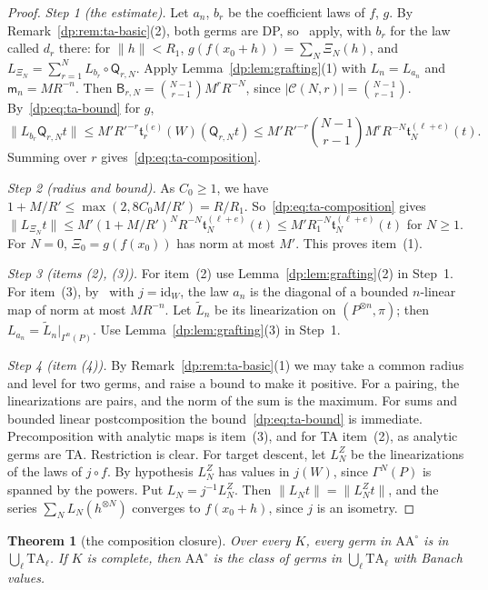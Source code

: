 \documentclass[11pt]{amsart}
\newtheorem{theorem}{Theorem}[section]
\theoremstyle{definition}
\theoremstyle{remark}
\numberwithin{equation}{section}
\newcommand{\id}{\mathrm{id}}
\newcommand{\abs}[1]{\lvert #1\rvert}
\newcommand{\norm}[1]{\lVert #1\rVert}
\theoremstyle{plain}
\theoremstyle{definition}
\theoremstyle{plain}
\begin{document}
\begin{proof}
\emph{Step 1 (the estimate).} Let $a_n$, $b_r$ be the coefficient laws of $f$, $g$. By Remark~\ref{dp:rem:ta-basic}(2), both germs are DP, so~\cite[Lemmas~Q.3, Q.4]{I} apply, with $b_r$ for the law called $d_r$ there: for $\norm h<R_1$, $g(f(x_0+h))=\sum_N\Xi_N(h)$, and $L_{\Xi_N}=\sum_{r=1}^NL_{b_r}\circ\mathsf Q_{r,N}$. Apply Lemma~\ref{dp:lem:grafting}(1) with $L_n=L_{a_n}$ and $\mathsf m_n=MR^{-n}$. Then $\mathsf B_{r,N}=\binom{N-1}{r-1}M^rR^{-N}$, since $\abs{\mathcal C(N,r)}=\binom{N-1}{r-1}$. By~\eqref{dp:eq:ta-bound} for $g$,
\[
 \norm{L_{b_r}\mathsf Q_{r,N}t}\le M'R'^{-r}\mathfrak t^{(e)}_r(W)(\mathsf Q_{r,N}t)\le M'R'^{-r}\binom{N-1}{r-1}M^rR^{-N}\mathfrak t^{(\ell+e)}_N(t).
\]
Summing over $r$ gives~\eqref{dp:eq:ta-composition}.

\emph{Step 2 (radius and bound).} As $C_0\ge1$, we have $1+M/R'\le\max(2,8C_0M/R')=R/R_1$. So~\eqref{dp:eq:ta-composition} gives $\norm{L_{\Xi_N}t}\le M'(1+M/R')^NR^{-N}\mathfrak t^{(\ell+e)}_N(t)\le M'R_1^{-N}\mathfrak t^{(\ell+e)}_N(t)$ for $N\ge1$. For $N=0$, $\Xi_0=g(f(x_0))$ has norm at most $M'$. This proves item~(1).

\emph{Step 3 (items (2), (3)).} For item~(2) use Lemma~\ref{dp:lem:grafting}(2) in Step~1. For item~(3), by~\cite[Proposition~14.9(1)]{I} with $j=\id_W$, the law $a_n$ is the diagonal of a bounded $n$-linear map of norm at most $MR^{-n}$. Let $\tilde L_n$ be its linearization on $(P^{\otimes n},\pi)$; then $L_{a_n}=\tilde L_n|_{\Gamma^n(P)}$. Use Lemma~\ref{dp:lem:grafting}(3) in Step~1.

\emph{Step 4 (item (4)).} By Remark~\ref{dp:rem:ta-basic}(1) we may take a common radius and level for two germs, and raise a bound to make it positive. For a pairing, the linearizations are pairs, and the norm of the sum is the maximum. For sums and bounded linear postcomposition the bound~\eqref{dp:eq:ta-bound} is immediate. Precomposition with analytic maps is item~(3), and for TA item~(2), as analytic germs are TA. Restriction is clear. For target descent, let $L^Z_N$ be the linearizations of the laws of $j\circ f$. By hypothesis $L^Z_N$ has values in $j(W)$, since $\Gamma^N(P)$ is spanned by the powers. Put $L_N=j^{-1}L^Z_N$. Then $\norm{L_Nt}=\norm{L^Z_Nt}$, and the series $\sum_NL_N(h^{\otimes N})$ converges to $f(x_0+h)$, since $j$ is an isometry.
\end{proof}

\begin{theorem}[the composition closure]\label{dp:thm:composition-closure}
Over every $K$, every germ in $\mathrm{AA}^\circ$ is in $\bigcup_\ell\mathrm{TA}_\ell$. If $K$ is complete, then $\mathrm{AA}^\circ$ is the class of germs in $\bigcup_\ell\mathrm{TA}_\ell$ with Banach values.
\end{theorem}
\end{document}
